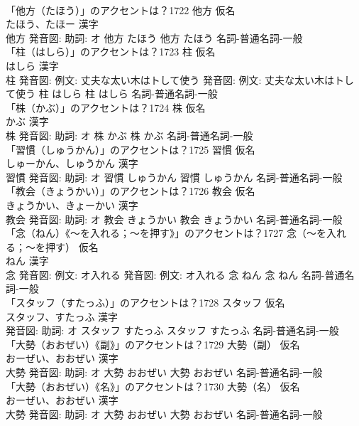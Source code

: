 \documentclass[8pt]{extreport}
\begin{document}
\begin{CJK}{UTF8}{min}
\\	「他方（たほう）」のアクセントは？1722	他方 仮名　
\\	たほう、たほー 漢字　
\\	他方 発音図: 助詞: オ	他方 たほう		他方 たほう				名詞-普通名詞-一般 
\\	「柱（はしら）」のアクセントは？1723	柱 仮名　
\\	はしら 漢字　
\\	柱 発音図: 例文: 丈夫な太い木はトして使う 発音図: 例文: 丈夫な太い木はトして使う	柱 はしら		柱 はしら				名詞-普通名詞-一般 
\\	「株（かぶ）」のアクセントは？1724	株 仮名　
\\	かぶ 漢字　
\\	株 発音図: 助詞: オ	株 かぶ		株 かぶ				名詞-普通名詞-一般 
\\	「習慣（しゅうかん）」のアクセントは？1725	習慣 仮名　
\\	しゅーかん、しゅうかん 漢字　
\\	習慣 発音図: 助詞: オ	習慣 しゅうかん		習慣 しゅうかん				名詞-普通名詞-一般 
\\	「教会（きょうかい）」のアクセントは？1726	教会 仮名　
\\	きょうかい、きょーかい 漢字　
\\	教会 発音図: 助詞: オ	教会 きょうかい		教会 きょうかい				名詞-普通名詞-一般 
\\	「念（ねん）《〜を入れる；〜を押す》」のアクセントは？1727	念（〜を入れる；〜を押す） 仮名　
\\	ねん 漢字　
\\	念 発音図: 例文: オ入れる 発音図: 例文: オ入れる	念 ねん		念 ねん				名詞-普通名詞-一般 
\\	「スタッフ（すたっふ）」のアクセントは？1728	スタッフ 仮名　
\\	スタッフ、すたっふ 漢字　
\\	発音図: 助詞: オ	スタッフ すたっふ		スタッフ すたっふ				名詞-普通名詞-一般 
\\	「大勢（おおぜい）《副》」のアクセントは？1729	大勢（副） 仮名　
\\	おーぜい、おおぜい 漢字　
\\	大勢 発音図: 助詞: オ	大勢 おおぜい		大勢 おおぜい				名詞-普通名詞-一般 
\\	「大勢（おおぜい）《名》」のアクセントは？1730	大勢（名） 仮名　
\\	おーぜい、おおぜい 漢字　
\\	大勢 発音図: 助詞: オ	大勢 おおぜい		大勢 おおぜい				名詞-普通名詞-一般 

\end{CJK}
\end{document}
